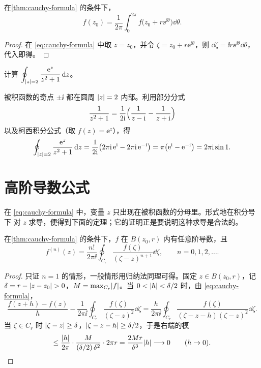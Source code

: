 \documentclass{mojing-notes}
\begin{document}
\begin{corollary}[平均值性质]\label{cor:mean-value}
在\cref{thm:cauchy-formula} 的条件下，
\[
  f(z_0)=\frac{1}{2\pi}\int_0^{2\pi}f\bigl(z_0+r\ee^{\ii\theta}\bigr)\dd\theta .
\]
\end{corollary}

\begin{proof}
在 \cref{eq:cauchy-formula} 中取 $z=z_0$，并令 $\zeta=z_0+r\ee^{\ii\theta}$，则
$\dd\zeta=\ii r\ee^{\ii\theta}\dd\theta$，代入即得。
\end{proof}

\begin{example}\label{ex:ez-over-z2+1}
计算 $\displaystyle\oint_{\lvert z\rvert=2}\frac{\mathrm{e}^z}{z^2+1}\mathop{}\!\mathrm{d} z$。
\end{example}

\begin{solution}
被积函数的奇点 $\pm\ii$ 都在圆周 $\lvert z\rvert=2$ 内部。利用部分分式
\[
  \frac{1}{z^2+1}=\frac{1}{2\mathrm{i}}\Bigl(\frac{1}{z-\mathrm{i}}-\frac{1}{z+\mathrm{i}}\Bigr)
\]
以及柯西积分公式（取 $f(z)=\ee^z$），得
\[
  \oint_{\lvert z\rvert=2}\frac{\mathrm{e}^z}{z^2+1}\mathop{}\!\mathrm{d} z
  =\frac{1}{2\mathrm{i}}\bigl(2\pi\mathrm{i}\,\mathrm{e}^{\mathrm{i}}-2\pi\mathrm{i}\,\mathrm{e}^{-\mathrm{i}}\bigr)
  =\pi\bigl(\mathrm{e}^{\mathrm{i}}-\mathrm{e}^{-\mathrm{i}}\bigr)=2\pi\mathrm{i}\sin 1 .
\]
\end{solution}

\section{高阶导数公式}

在 \cref{eq:cauchy-formula} 中，变量 $z$ 只出现在被积函数的分母里。形式地在积分号下
对 $z$ 求导，便得到下面的定理；它的证明正是要说明这种求导是合法的。

\begin{theorem}[高阶导数公式]\label{thm:higher-derivative}
在\cref{thm:cauchy-formula} 的条件下，$f$ 在 $B(z_0,r)$ 内有任意阶导数，且
\begin{equation}\label{eq:higher-derivative}
  f^{(n)}(z)=\frac{n!}{2\pi\ii}\oint_{C_r}\frac{f(\zeta)}{(\zeta-z)^{n+1}}\dd\zeta,
  \qquad n=0,1,2,\dotsc .
\end{equation}
\end{theorem}

\begin{proof}
只证 $n=1$ 的情形，一般情形用归纳法同理可得。固定 $z\in B(z_0,r)$，记
$\delta=r-\lvert z-z_0\rvert>0$，$M=\max_{C_r}\lvert f\rvert$。当 $0<\lvert h\rvert<\delta/2$ 时，由
\cref{eq:cauchy-formula}，
\[
  \frac{f(z+h)-f(z)}{h}-\frac{1}{2\pi\ii}\oint_{C_r}\frac{f(\zeta)}{(\zeta-z)^2}\dd\zeta
  =\frac{h}{2\pi\ii}\oint_{C_r}\frac{f(\zeta)}{(\zeta-z-h)(\zeta-z)^2}\dd\zeta .
\]
当 $\zeta\in C_r$ 时 $\lvert\zeta-z\rvert\ge\delta$，$\lvert\zeta-z-h\rvert\ge\delta/2$，于是右端的模
\[
  \le\frac{\lvert h\rvert}{2\pi}\cdot\frac{M}{(\delta/2)\,\delta^2}\cdot2\pi r
  =\frac{2Mr}{\delta^3}\lvert h\rvert\longrightarrow0\qquad(h\to0). \qedhere
\]
\end{proof}
\end{document}

